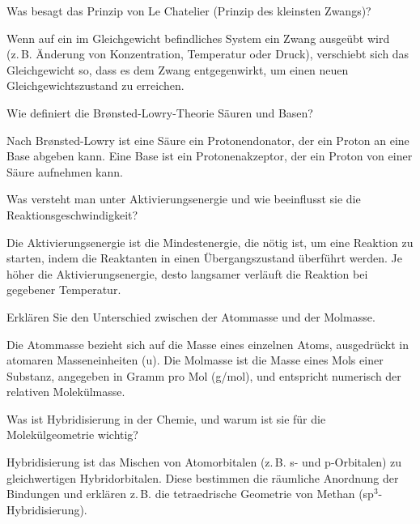 \begin{exercise}[subtitle=Le Chatelier, points=1, Punkt=1]
Was besagt das Prinzip von Le Chatelier (Prinzip des kleinsten Zwangs)?
\begin{solution}
Wenn auf ein im Gleichgewicht befindliches System ein Zwang ausgeübt wird (z. B. Änderung von Konzentration, Temperatur oder Druck), verschiebt sich das Gleichgewicht so, dass es dem Zwang entgegenwirkt, um einen neuen Gleichgewichtszustand zu erreichen.
\end{solution}
\end{exercise}

\begin{exercise}[subtitle=Brønsted-Lowry-Säure, points=1, Punkt=1]
Wie definiert die Brønsted-Lowry-Theorie Säuren und Basen?
\begin{solution}
Nach Brønsted-Lowry ist eine Säure ein Protonendonator, der ein Proton an eine Base abgeben kann. Eine Base ist ein Protonenakzeptor, der ein Proton von einer Säure aufnehmen kann.
\end{solution}
\end{exercise}

\begin{exercise}[subtitle=Aktivierungsenergie, points=1, Punkt=1]
Was versteht man unter Aktivierungsenergie und wie beeinflusst sie die Reaktionsgeschwindigkeit?
\begin{solution}
Die Aktivierungsenergie ist die Mindestenergie, die nötig ist, um eine Reaktion zu starten, indem die Reaktanten in einen Übergangszustand überführt werden. Je höher die Aktivierungsenergie, desto langsamer verläuft die Reaktion bei gegebener Temperatur.
\end{solution}
\end{exercise}

\begin{exercise}[subtitle=Atommasse vs. Molmasse, points=1, Punkt=1]
Erklären Sie den Unterschied zwischen der Atommasse und der Molmasse.
\begin{solution}
Die Atommasse bezieht sich auf die Masse eines einzelnen Atoms, ausgedrückt in atomaren Masseneinheiten (u). Die Molmasse ist die Masse eines Mols einer Substanz, angegeben in Gramm pro Mol (g/mol), und entspricht numerisch der relativen Molekülmasse.
\end{solution}
\end{exercise}

\begin{exercise}[subtitle=Hybridisierung, points=1, Punkt=1]
Was ist Hybridisierung in der Chemie, und warum ist sie für die Molekülgeometrie wichtig?
\begin{solution}
Hybridisierung ist das Mischen von Atomorbitalen (z. B. s- und p-Orbitalen) zu gleichwertigen Hybridorbitalen. Diese bestimmen die räumliche Anordnung der Bindungen und erklären z. B. die tetraedrische Geometrie von Methan (sp\(^3\)-Hybridisierung).
\end{solution}
\end{exercise}

